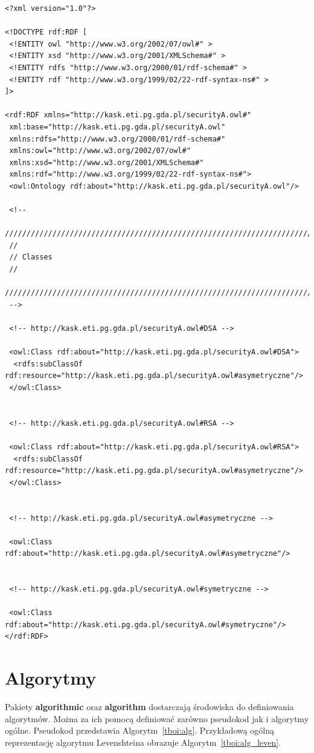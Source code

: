\documentclass[twoside,a4paper]{book}
\begin{document}
\lstset{basicstyle=\scriptsize}
\begin{lstlisting}[frame=single,caption={Przykładowy listing},label=kod:listingA]
<?xml version="1.0"?>

<!DOCTYPE rdf:RDF [
 <!ENTITY owl "http://www.w3.org/2002/07/owl#" >
 <!ENTITY xsd "http://www.w3.org/2001/XMLSchema#" >
 <!ENTITY rdfs "http://www.w3.org/2000/01/rdf-schema#" >
 <!ENTITY rdf "http://www.w3.org/1999/02/22-rdf-syntax-ns#" >
]>

<rdf:RDF xmlns="http://kask.eti.pg.gda.pl/securityA.owl#"
 xml:base="http://kask.eti.pg.gda.pl/securityA.owl"
 xmlns:rdfs="http://www.w3.org/2000/01/rdf-schema#"
 xmlns:owl="http://www.w3.org/2002/07/owl#"
 xmlns:xsd="http://www.w3.org/2001/XMLSchema#"
 xmlns:rdf="http://www.w3.org/1999/02/22-rdf-syntax-ns#">
 <owl:Ontology rdf:about="http://kask.eti.pg.gda.pl/securityA.owl"/>

 <!-- 
 ///////////////////////////////////////////////////////////////////////////////////////
 //
 // Classes
 //
 ///////////////////////////////////////////////////////////////////////////////////////
 -->

 <!-- http://kask.eti.pg.gda.pl/securityA.owl#DSA -->

 <owl:Class rdf:about="http://kask.eti.pg.gda.pl/securityA.owl#DSA">
  <rdfs:subClassOf rdf:resource="http://kask.eti.pg.gda.pl/securityA.owl#asymetryczne"/>
 </owl:Class>

  
 <!-- http://kask.eti.pg.gda.pl/securityA.owl#RSA -->

 <owl:Class rdf:about="http://kask.eti.pg.gda.pl/securityA.owl#RSA">
  <rdfs:subClassOf rdf:resource="http://kask.eti.pg.gda.pl/securityA.owl#asymetryczne"/>
 </owl:Class>

  
 <!-- http://kask.eti.pg.gda.pl/securityA.owl#asymetryczne -->

 <owl:Class rdf:about="http://kask.eti.pg.gda.pl/securityA.owl#asymetryczne"/>
  

 <!-- http://kask.eti.pg.gda.pl/securityA.owl#symetryczne -->

 <owl:Class rdf:about="http://kask.eti.pg.gda.pl/securityA.owl#symetryczne"/>
</rdf:RDF>

\end{lstlisting}

\section{Algorytmy}
\label{algorytmy}
Pakiety \textbf{algorithmic} oraz \textbf{algorithm} dostarczają środowiska do definiowania algorytmów. Można za ich pomocą definiować zarówno pseudokod jak i algorytmy ogólne. Pseudokod przedstawia Algorytm~\ref{tboi:alg}. Przykładową ogólną reprezentację algorytmu Levenshteina obrazuje Algorytm~\ref{tboi:alg_leven}.
\end{document}
